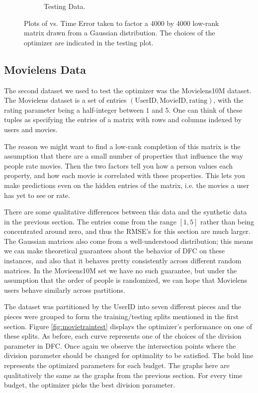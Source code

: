 \begin{figure}
\begin{subfigure}[b]{.45\textwidth}
\begin{center}
		\caption{Testing Data.}
\end{center}
	\end{subfigure}
\hfill
	\caption{Plots of vs. Time Error taken to factor a 4000 by 4000 
	low-rank matrix drawn from a Gaussian distribution. The choices of the 
	optimizer are indicated in the testing plot.}	

\end{figure}

\subsection{Movielens Data}
The second dataset we used to test the optimizer was the Movielens10M 
dataset. The Movielens dataset is a set of entries 
$(\text{UserID},\text{MovieID},\text{rating})$, with the rating 
parameter being a half-integer between $1$ and $5$. One can think of 
these tuples as specifying the entries of a matrix with rows 
and columns indexed by users and movies. 

The reason we might want to find a low-rank completion of this matrix 
is the assumption that there are a small number of properties that 
influence the way people rate movies. Then the two factors tell you 
how a person values each property, and how each movie is correlated 
with these properties. This lets you make predictions even on the 
hidden entries of the matrix, i.e. the movies a user has yet to 
see or rate. 

There are some qualitative differences between this data and the 
synthetic data in the previous section. The entries come from 
the range $[1,5]$ rather than being concentrated around zero, 
and thus the RMSE's for this section are much larger. The 
Gaussian matrices also come from a well-understood distribution; this
means we can make theoretical guarantees about the behavior of  DFC 
on these instances, and also that it behaves pretty consistently across 
different random matrices. In the Movieens10M set we have no such 
guarantee, but under the assumption that the order of people is randomized,
we can hope that Movielens users behave similarly across partitions. 

The dataset was partitioned by the UserID into seven different 
pieces and the pieces were grouped to form the training/testing 
splits mentioned in the first section. Figure \ref{fig:movietraintest} 
displays the optimizer's performance on one of these splits. As before, 
each curve represents one of the choices of the division parameter in DFC. 
Once again we observe the intersection points where the division 
parameter should be changed for optimality to be satisfied. The bold 
line represents the optimized parameters for each budget. The graphs 
here are qualitatively the same as the graphs from the previous section. 
For every time budget, the optimizer picks the best division parameter. 

